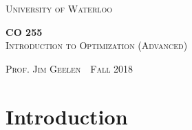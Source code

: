 \documentclass[11pt]{article}
\newcommand{\thiscoursecode}{CO 255}
\newcommand{\thiscoursename}{Introduction to Optimization (Advanced)}
\newcommand{\thisprof}{Jim Geelen}
\newcommand{\thisterm}{Fall 2018}
\begin{document}
\begin{titlepage}
\begin{centering}
{\scshape\LARGE University of Waterloo \par}
\globe
{\huge\bf \thiscoursecode}\\
{\scshape\Large \thiscoursename}\\
\vspace{.3cm}
{\scshape Prof. \thisprof~\textbullet~\thisterm\par}
\end{centering}
\sectionline
\tableofcontents
\sectionline
\thispagestyle{empty}
\end{titlepage}

\pagebreak
\section{Introduction}
\end{document}

